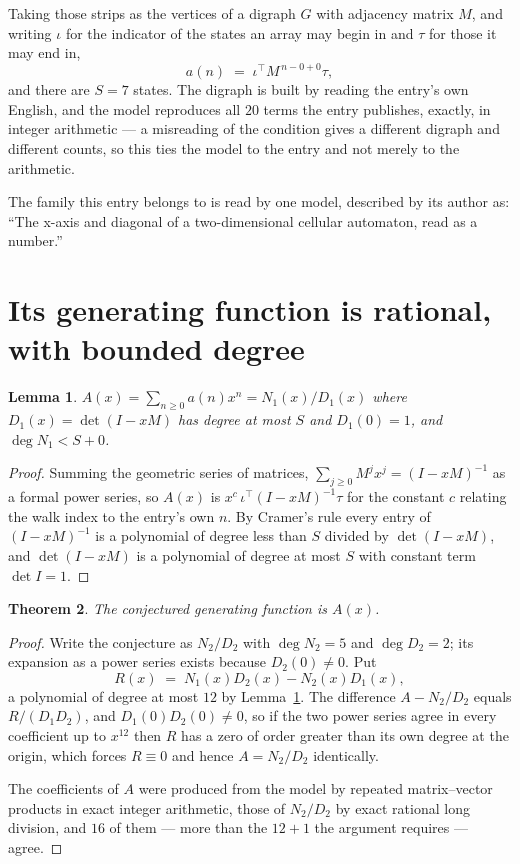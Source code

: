 \documentclass[11pt,a4paper]{article}
\theoremstyle{plain}
\newtheorem{theorem}{Theorem}
\newtheorem{lemma}[theorem]{Lemma}
\theoremstyle{definition}
\begin{document}
Taking those strips as the vertices of a digraph $G$ with adjacency matrix $M$, and writing
$\iota$ for the indicator of the states an array may begin in and $\tau$ for those it may end
in,
\[
a(n)\;=\;\iota^{\!\top}M^{\,n-0+0}\tau ,
\]
and there are $S=7$ states. The digraph is built by reading the entry's own English, and the
model reproduces all $20$ terms the entry publishes, exactly, in integer arithmetic --- a
misreading of the condition gives a different digraph and different counts, so this ties the
model to the entry and not merely to the arithmetic.

The family this entry belongs to is read by one model, described by its author as: ``The x-axis and diagonal of a two-dimensional cellular automaton, read as a number.''


\section{Its generating function is rational, with bounded degree}

\begin{lemma}\label{lem:rat}
$A(x)=\sum_{n\ge0}a(n)x^n=N_1(x)/D_1(x)$ where $D_1(x)=\det(I-xM)$ has degree at most
$S$ and $D_1(0)=1$, and $\deg N_1<S+0$.
\end{lemma}

\begin{proof}
Summing the geometric series of matrices, $\sum_{j\ge0}M^jx^j=(I-xM)^{-1}$ as a formal
power series, so $A(x)$ is $x^{c}\,\iota^{\!\top}(I-xM)^{-1}\tau$ for the constant $c$
relating the walk index to the entry's own $n$. By Cramer's rule every entry of
$(I-xM)^{-1}$ is a polynomial of degree less than $S$ divided by $\det(I-xM)$, and
$\det(I-xM)$ is a polynomial of degree at most $S$ with constant term $\det I=1$.
\end{proof}

\begin{theorem}
The conjectured generating function is $A(x)$.
\end{theorem}

\begin{proof}
Write the conjecture as $N_2/D_2$ with $\deg N_2=5$ and $\deg D_2=2$; its expansion as a
power series exists because $D_2(0)\neq0$. Put
\[
R(x)\;=\;N_1(x)D_2(x)-N_2(x)D_1(x),
\]
a polynomial of degree at most $12$ by Lemma~\ref{lem:rat}. The difference
$A-N_2/D_2$ equals $R/(D_1D_2)$, and $D_1(0)D_2(0)\neq0$, so if the two power series agree in
every coefficient up to $x^{12}$ then $R$ has a zero of order greater than its own
degree at the origin, which forces $R\equiv0$ and hence $A=N_2/D_2$ identically.

The coefficients of $A$ were produced from the model by repeated matrix--vector products in
exact integer arithmetic, those of $N_2/D_2$ by exact rational long division, and $16$
of them --- more than the $12+1$ the argument requires --- agree.
\end{proof}
\end{document}
